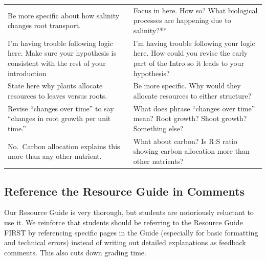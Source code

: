 \documentclass[
]{book}
\begin{document}
\begin{longtable}[]{@{}
  >{\raggedright\arraybackslash}p{}
  >{\raggedright\arraybackslash}p{}@{}}
Be more specific about how salinity changes root transport. & Focus in here. How so? What biological processes are happening due to salinity?** \\
I'm having trouble following logic here. Make sure your hypothesis is consistent with the rest of your introduction & I'm having trouble following your logic here. How could you revise the early part of the Intro so it leads to your hypothesis? \\
State here why plants allocate resources to leaves versus roots. & Be more specific. Why would they allocate resources to either structure? \\
Revise ``changes over time'' to say ``changes in root growth per unit time.'' & What does phrase ``changes over time'' mean? Root growth? Shoot growth? Something else? \\
No.~Carbon allocation explains this more than any other nutrient. & What about carbon? Is R:S ratio showing carbon allocation more than other nutrients? \\
\bottomrule
\end{longtable}

\hypertarget{reference-the-resource-guide-in-comments}{%
\subsection{Reference the Resource Guide in Comments}\label{reference-the-resource-guide-in-comments}}

Our Resource Guide is very thorough, but students are notoriously reluctant to use it. We reinforce that students should be referring to the Resource Guide FIRST by referencing specific pages in the Guide (especially for basic formatting and technical errors) instead of writing out detailed explanations as feedback comments. This also cuts down grading time.
\end{document}
